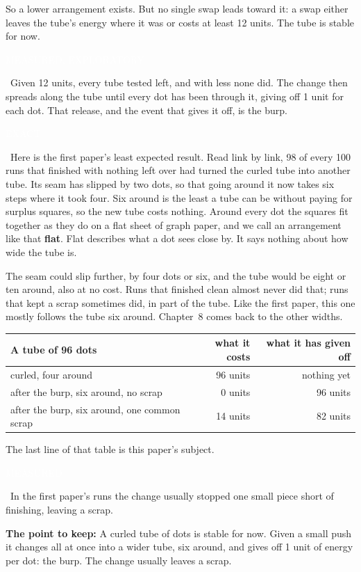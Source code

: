 \documentclass[11pt,letterpaper]{article}
\newcommand{\takeaway}[1]{\par\medskip\noindent\colorbox{pale}{\parbox{\dimexpr\linewidth-2\fboxsep\relax}{\vspace{0.35em}\textbf{The point to keep:} #1\vspace{0.35em}}}\par\medskip}
\newcommand{\sub}[1]{\par\medskip{\color{ink}\large\bfseries #1}\par}
\newcommand{\tagbox}[2]{{\sffamily\scriptsize\colorbox{#1}{\textcolor{white}{\strut #2}}}}
\newcommand{\Exact}{\tagbox{kExact}{EXACT}}
\newcommand{\Meas}{\tagbox{kMeas}{MEASURED}}
\newcommand{\MeasX}{\tagbox{kMeas}{MEASURED, EXPLORATORY}}
\begin{document}
So a lower arrangement exists. But no single swap leads toward it: a swap either leaves the tube's
energy where it was or costs at least 12 units. The tube is stable for now. \MeasX\ Given 12 units,
every tube tested left, and with less none did. The change then spreads along the tube until every dot
has been through it, giving off 1 unit for each dot. That release, and the event that gives it off, is the burp.

\sub{What the tube turns into}
\Exact\ Here is the first paper's least expected result. Read link by link, 98 of every 100 runs that
finished with nothing left over had turned the curled tube into another tube. Its seam has slipped by
two dots, so that going around it now takes six steps where it took
four. Six around is the least a tube can be without paying for surplus squares, so the new tube costs
nothing. Around every dot the squares fit together as they do on a flat sheet of graph paper, and we
call an arrangement like that \textbf{flat}. Flat describes what a dot sees close by. It says nothing
about how wide the tube is.

The seam could slip further, by four dots or six, and the tube would be eight or ten around, also at no
cost. Runs that finished clean almost never did that; runs that kept a scrap sometimes did, in part of
the tube. Like the first paper, this one mostly follows the tube six around. Chapter~8 comes back to the
other widths.

\begin{center}
\renewcommand{\arraystretch}{1.15}
\begin{tabular}{lrr}
\toprule
A tube of 96 dots & what it costs & what it has given off\\
\midrule
curled, four around & 96 units & nothing yet\\
after the burp, six around, no scrap & 0 units & 96 units\\
after the burp, six around, one common scrap & 14 units & 82 units\\
\bottomrule
\end{tabular}
\end{center}

The last line of that table is this paper's subject. \Meas\ In the first paper's runs the change
usually stopped one small piece short of finishing, leaving a scrap.

\takeaway{A curled tube of dots is stable for now. Given a small push it changes all at once into a
wider tube, six around, and gives off 1 unit of energy per dot: the burp. The change usually leaves
a scrap.}
\end{document}
